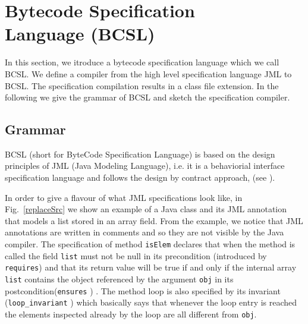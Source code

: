 
\section{Bytecode Specification \\Language (BCSL)}\label{bcSpecLg}
In this section, we itroduce a bytecode specification language which we call BCSL. We define a compiler from the high level specification language JML to BCSL. The specification compilation results in a class file extension. In the following we give the grammar of BCSL and sketch the specification compiler.



\subsection{Grammar} \label{grammar}
BCSL (short for ByteCode Specification Language) is based on the design principles of JML (Java Modeling Language), i.e. it is a behaviorial interface specification language and follows the design by contract approach, (see \cite{M97oos}).

In order to give a flavour of what JML specifications look like, in Fig.~\ref{replaceSrc} we show an example of a Java class and its 
JML annotation that models a list stored in an array field. 
From the example, we notice that JML annotations are written in comments and so they are not visible by the Java compiler.
The specification of method \verb!isElem! declares
 that when the method is called the field \verb!list! must not be null in its precondition (introduced by \verb!requires!) and that its return value will be true if and only if the internal array 
\verb!list! contains the object referenced by the argument \verb!obj! in its postcondition(\verb!ensures! ) . The method loop is also specified by
its invariant (\verb!loop_invariant! ) which basically says that whenever the loop entry is reached the elements inspected already by the loop are all different from \verb!obj!.

